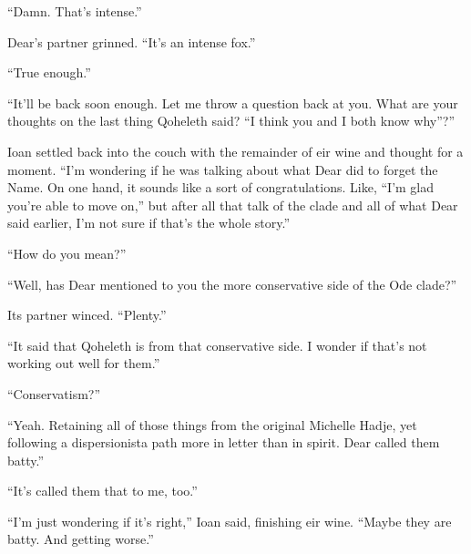 ``Damn. That's intense.''

Dear's partner grinned. ``It's an intense fox.''

``True enough.''

``It'll be back soon enough. Let me throw a question back at you. What are your thoughts on the last thing Qoheleth said? ``I think you and I both know why''?''

Ioan settled back into the couch with the remainder of eir wine and thought for a moment. ``I'm wondering if he was talking about what Dear did to forget the Name. On one hand, it sounds like a sort of congratulations. Like, ``I'm glad you're able to move on,'' but after all that talk of the clade and all of what Dear said earlier, I'm not sure if that's the whole story.''

``How do you mean?''

``Well, has Dear mentioned to you the more conservative side of the Ode clade?''

Its partner winced. ``Plenty.''

``It said that Qoheleth is from that conservative side. I wonder if that's not working out well for them.''

``Conservatism?''

``Yeah. Retaining all of those things from the original Michelle Hadje, yet following a dispersionista path more in letter than in spirit. Dear called them batty.''

``It's called them that to me, too.''

``I'm just wondering if it's right,'' Ioan said, finishing eir wine. ``Maybe they are batty. And getting worse.''

